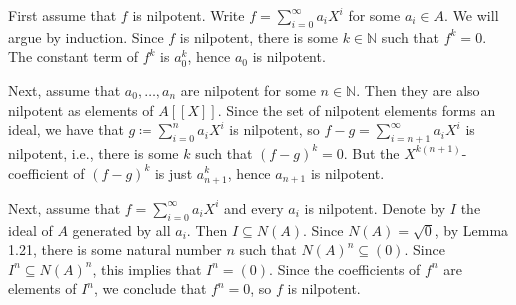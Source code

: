 First assume that $f$ is nilpotent. Write $f = \sum_{i = 0}^\infty a_iX^i$ for
some $a_i \in A$. We will argue by induction. Since $f$ is nilpotent,
there is some $k \in \mathbb{N}$ such that $f^k = 0$. The constant term of
$f^k$ is $a_0^k$, hence $a_0$ is nilpotent.

Next, assume that $a_0, \ldots, a_n$ are nilpotent for some $n \in \mathbb{N}$.
Then they are also nilpotent as elements of $A[[X]]$. Since the set of nilpotent
elements forms an ideal, we have that $g\coloneqq\sum_{i = 0}^na_iX^i$ is nilpotent, so
$f - g = \sum_{i = n+1}^\infty a_iX^i$ is nilpotent, i.e., there is some $k$ such
that $(f - g)^k = 0$. But the $X^{k(n+1)}$-coefficient of $(f - g)^k$ is just
$a_{n+1}^k$, hence $a_{n+1}$ is nilpotent.

Next, assume that $f = \sum_{i = 0}^\infty a_iX^i$ and every $a_i$ is nilpotent.
Denote by $I$ the ideal of $A$ generated by all $a_i$. Then $I \subseteq N(A)$.
Since $N(A) = \sqrt{0}$, by Lemma 1.21, there is some natural number $n$ such
that $N(A)^n \subseteq (0)$. Since $I^n \subseteq N(A)^n$, this implies that
$I^n = (0)$. Since the coefficients of $f^n$ are elements of $I^n$, we conclude
that $f^n = 0$, so $f$ is nilpotent.
